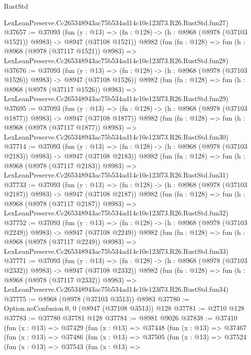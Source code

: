 \begin{lexlean}{RustStd}
\begin{coremodule}
    LexLeanPreserve.Cc265348943ac75b534ad14c10e123f73.R26.RustStd.fun27)
@37657 := @37093
    (fun (y : @13) =>
    (fn : @128) -> (h : @8968 (@8978 (@37103 @1521)) @8983) -> @8947 (@37108 @1521))
    @8982
    (fun (fn : @128) =>
    fun (h : @8968 (@8978 (@37117 @1521)) @8983) =>
    LexLeanPreserve.Cc265348943ac75b534ad14c10e123f73.R26.RustStd.fun28)
@37676 := @37093
    (fun (y : @13) =>
    (fn : @128) -> (h : @8968 (@8978 (@37103 @1526)) @8983) -> @8947 (@37108 @1526))
    @8982
    (fun (fn : @128) =>
    fun (h : @8968 (@8978 (@37117 @1526)) @8983) =>
    LexLeanPreserve.Cc265348943ac75b534ad14c10e123f73.R26.RustStd.fun29)
@37695 := @37093
    (fun (y : @13) =>
    (fn : @128) -> (h : @8968 (@8978 (@37103 @1877)) @8983) -> @8947 (@37108 @1877))
    @8982
    (fun (fn : @128) =>
    fun (h : @8968 (@8978 (@37117 @1877)) @8983) =>
    LexLeanPreserve.Cc265348943ac75b534ad14c10e123f73.R26.RustStd.fun30)
@37714 := @37093
    (fun (y : @13) =>
    (fn : @128) -> (h : @8968 (@8978 (@37103 @2183)) @8983) -> @8947 (@37108 @2183))
    @8982
    (fun (fn : @128) =>
    fun (h : @8968 (@8978 (@37117 @2183)) @8983) =>
    LexLeanPreserve.Cc265348943ac75b534ad14c10e123f73.R26.RustStd.fun31)
@37733 := @37093
    (fun (y : @13) =>
    (fn : @128) -> (h : @8968 (@8978 (@37103 @2187)) @8983) -> @8947 (@37108 @2187))
    @8982
    (fun (fn : @128) =>
    fun (h : @8968 (@8978 (@37117 @2187)) @8983) =>
    LexLeanPreserve.Cc265348943ac75b534ad14c10e123f73.R26.RustStd.fun32)
@37752 := @37093
    (fun (y : @13) =>
    (fn : @128) -> (h : @8968 (@8978 (@37103 @2249)) @8983) -> @8947 (@37108 @2249))
    @8982
    (fun (fn : @128) =>
    fun (h : @8968 (@8978 (@37117 @2249)) @8983) =>
    LexLeanPreserve.Cc265348943ac75b534ad14c10e123f73.R26.RustStd.fun33)
@37771 := @37093
    (fun (y : @13) =>
    (fn : @128) -> (h : @8968 (@8978 (@37103 @2332)) @8983) -> @8947 (@37108 @2332))
    @8982
    (fun (fn : @128) =>
    fun (h : @8968 (@8978 (@37117 @2332)) @8983) =>
    LexLeanPreserve.Cc265348943ac75b534ad14c10e123f73.R26.RustStd.fun34)
@37775 := @8968 (@8978 (@37103 @3513)) @8983
@37780 := Option.noConfusion.{0, 0} (@8947 (@37108 @3513)) @128
@37781 := @2710 @128
@37783 := @37780 @37781 @128
@37784 := @8981 @9026
@37838 := @37410
    (fun (x : @13) =>
    @37429
      (fun (x : @13) =>
      @37448
        (fun (x : @13) =>
        @37467
          (fun (x : @13) =>
          @37486
            (fun (x : @13) =>
            @37505
              (fun (x : @13) =>
              @37524
                (fun (x : @13) =>
                @37543
                  (fun (x : @13) =>

\end{coremodule}
\end{lexlean}
